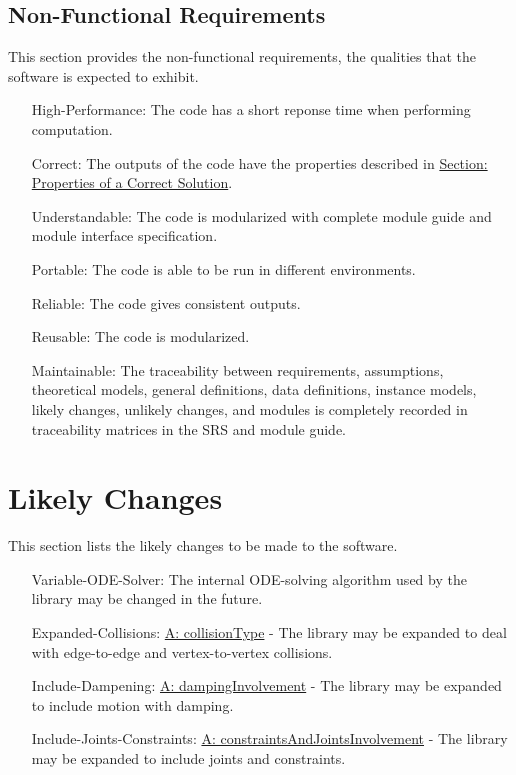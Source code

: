 \documentclass[12pt]{article}
\begin{document}
\subsection{Non-Functional Requirements}
\label{Sec:NFRs}
This section provides the non-functional requirements, the qualities that the software is expected to exhibit.
\begin{itemize}
\item[High-Performance:\phantomsection\label{highPerformance}]The code has a short reponse time when performing computation.
\item[Correct:\phantomsection\label{correct}]The outputs of the code have the properties described in \hyperref[Sec:CorSolProps]{Section: Properties of a Correct Solution}.
\item[Understandable:\phantomsection\label{understandable}]The code is modularized with complete module guide and module interface specification.
\item[Portable:\phantomsection\label{portable}]The code is able to be run in different environments.
\item[Reliable:\phantomsection\label{reliable}]The code gives consistent outputs.
\item[Reusable:\phantomsection\label{reusable}]The code is modularized.
\item[Maintainable:\phantomsection\label{maintainable}]The traceability between requirements, assumptions, theoretical models, general definitions, data definitions, instance models, likely changes, unlikely changes, and modules is completely recorded in traceability matrices in the SRS and module guide.
\end{itemize}
\section{Likely Changes}
\label{Sec:LCs}
This section lists the likely changes to be made to the software.
\begin{itemize}
\item[Variable-ODE-Solver:\phantomsection\label{lcVODES}]The internal ODE-solving algorithm used by the library may be changed in the future.
\item[Expanded-Collisions:\phantomsection\label{lcEC}]\hyperref[assumpCT]{A: collisionType} - The library may be expanded to deal with edge-to-edge and vertex-to-vertex collisions.
\item[Include-Dampening:\phantomsection\label{lcID}]\hyperref[assumpDI]{A: dampingInvolvement} - The library may be expanded to include motion with damping.
\item[Include-Joints-Constraints:\phantomsection\label{lcIJC}]\hyperref[assumpCAJI]{A: constraintsAndJointsInvolvement} - The library may be expanded to include joints and constraints.
\end{itemize}
\end{document}
